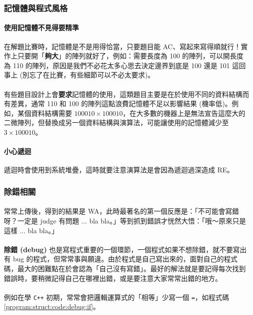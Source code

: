 \documentclass[12pt,a4paper,oneside]{report}
\begin{document}
\begin{CJK}{UTF8}{bkai}
\subsubsection{記憶體與程式風格}

\paragraph{使用記憶體不見得要精準}在解題比賽時，記憶體是不是用得恰當，只要題目能 AC、寫起來寫得順就行！實作上只要開「{\color{blue}\textbf{夠大}}」的陣列就好了，例如：需要長度為 100 的陣列，可以開長度為 110 的陣列，原因是我們不必花太多心思去決定邊界到底是 100 還是 101 這回事上 (別忘了在比賽，有些細節可以不必太要求)。
\paragraph{}有些題目設計上會\textbf{要求}記憶體的使用，這類題目主要是在於使用不同的資料結構而有差異，通常 110 和 100 的陣列這點浪費記憶體不足以影響結果 (機率低)。例如，某個資料結構需要 $100010\times{100010}$，在大多數的機器上是無法宣告這麼大的二微陣列，但替換成另一個資料結構與演算法，可能讓使用的記憶體減少至 $3\times{100010}$。

\paragraph{小心遞迴}遞迴時會使用到系統堆疊，這時就要注意演算法是會因為遞迴過深造成 RE。

\subsubsection{除錯相關}

\paragraph{}常常上傳後，得到的結果是 WA，此時最著名的第一個反應是：「不可能會寫錯呀？一定是 judge 有問題 ... bla bla。」等到抓到錯誤才恍然大悟：「哦～原來只是這樣 ... bla bla。」
\paragraph{}\textbf{除錯 (debug)} 也是寫程式重要的一個環節，一個程式如果不想除錯，就不要寫出有 bug 的程式，但常常事與願違。由於程式是自己寫出來的，面對自己的程式碼，最大的困難點在於會認為「自己沒有寫錯」。最好的解法就是要記得每次找到錯誤時，要稍微記得自己在哪裡出錯，或是要注意大家常常出錯的地方。
\paragraph{}例如在學 \texttt{C++} 初期，常常會把邏輯運算式的「相等」少寫一個 \lstinline!=!，如程式碼 \ref{program:struct:code:debug:if}。


\end{CJK}
\end{document}
